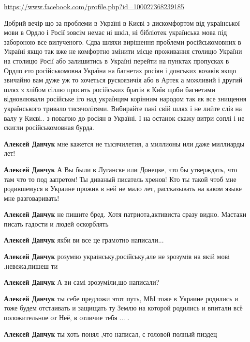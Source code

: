 \begin{itemize}
\url{https://www.facebook.com/profile.php?id=100027368239185}

Добрий вечір що за проблеми в Україні в Києві з дискомфортом від української
мови в Ордло і Росії зовсім немає ні шкіл, ні бібліотек українська мова під
забороною все вилученого. Єдва шляхи вирішення проблеми російськомовних в
Україні якщо так вже не комфортно змінити місце проживання столицю України на
столицю Росії або залишитись в Україні перейти на пунктах пропусках в Ордло єто
російськомовна Україна на багнетах росіян і донських козаків якщо звичайно вам
дуже уж то хочеться рускоязичія або в Артек а можливий і другий шлях з хлібом
сіллю просить російських братів в Київ щоби багнетами відновлювали російське
іго над українцям корінним народом так як все знищення українського тривало
тисячолітями. Вибирайте пані свій шлях і не лийте сліз на валу у Києві.. з
повагою до росіян в Україні. І на останок скажу витри соплі і не скигли
російськомовная бурда.

\begin{itemize}

\textbf{Алексей Данчук} мне кажется не тысячилетия, а миллионы или даже миллиарды лет!

\textbf{Алексей Данчук} А Вы были в Луганске или Донецке, что бы утверждать,
что там что то под запретом! Ты диваный писатель хренов! Кто ты такой чтоб мне
родившемуся в Украине прожив в ней не мало лет, рассказывать на каком языке мне
разговаривать!

\textbf{Алексей Данчук} не пишите бред. Хотя патриота,активиста сразу видно.
Мастаки писать гадости и людей оскорблять

\textbf{Алексей Данчук} якби ви все це грамотно написали...

\textbf{Алексей Данчук} розумiю украiнську,росiйську,але не зрозумiв на якiй мовi ,невежа,пишеш ти

\textbf{Алексей Данчук} А ви самі зрозуміли,що написали?

\textbf{Алексей Данчук} ты себе предложи этот путь, МЫ тоже в Украине родились и тоже будем отстаивать и защищать ту Землю на которой родились и впитали всё положительное от Неё, в отличие тебя ... .

\textbf{Алексей Данчук} ты хоть понял ,что написал, с головой полный пиздец



\end{itemize}
\end{itemize}
